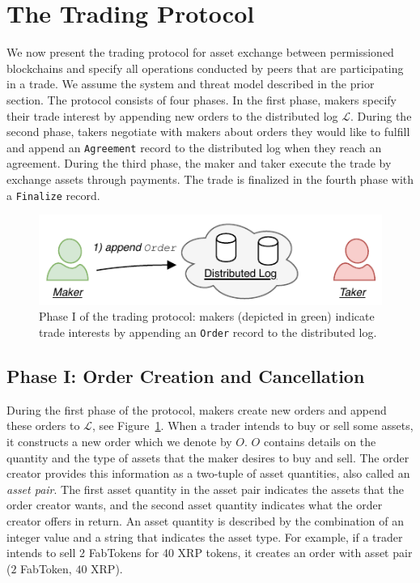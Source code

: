 \section{The \ModelName{} Trading Protocol} \label{sec:protocol}
We now present the \ModelName{} trading protocol for asset exchange between permissioned blockchains and specify all operations conducted by peers that are participating in a trade.
We assume the system and threat model described in the prior section.
The protocol consists of four phases.
In the first phase, makers specify their trade interest by appending new orders to the distributed log $ \mathcal{L} $.
During the second phase, takers negotiate with makers about orders they would like to fulfill and append an \texttt{Agreement} record to the distributed log when they reach an agreement.
During the third phase, the maker and taker execute the trade by exchange assets through payments.
The trade is finalized in the fourth phase with a \texttt{Finalize} record.

\begin{figure}[h]
	\centering
	\includegraphics[width=0.6\linewidth]{xchange/assets/xchange_protocol_1}
	\caption{Phase I of the \ModelName{} trading protocol: makers (depicted in green) indicate trade interests by appending an \texttt{Order} record to the distributed log.}
	\label{fig:matching_protocol_1}
\end{figure}

\subsection*{Phase I: Order Creation and Cancellation}
\label{sec:phase_matching}

During the first phase of the \ModelName{} protocol, makers create new orders and append these orders to $ \mathcal{L} $, see Figure~\ref{fig:matching_protocol_1}.
When a trader intends to buy or sell some assets, it constructs a new order which we denote by $ O $.
$ O $ contains details on the quantity and the type of assets that the maker desires to buy and sell.
The order creator provides this information as a two-tuple of asset quantities, also called an \emph{asset pair}.
The first asset quantity in the asset pair indicates the assets that the order creator wants, and the second asset quantity indicates what the order creator offers in return.
An asset quantity is described by the combination of an integer value and a string that indicates the asset type.
For example, if a trader intends to sell 2 FabTokens for 40 XRP tokens, it creates an order with asset pair ($ 2 $ FabToken, $ 40 $ XRP).

